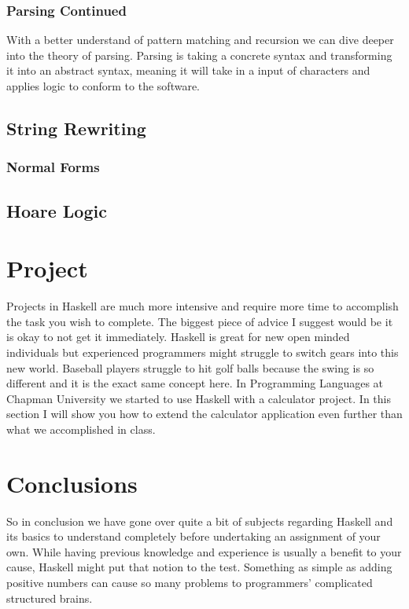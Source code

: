 \documentclass{article}
\begin{document}
        \subsubsection{Parsing Continued}
        With a better understand of pattern matching and recursion we can dive deeper into the theory of parsing. Parsing is taking a concrete syntax and transforming it into an abstract syntax, meaning it will take in a input of characters and applies logic to conform to the software. 
        
\subsection{String Rewriting}

    \subsubsection{Normal Forms}
    
\subsection{Hoare Logic}
    

\section{Project}

Projects in Haskell are much more intensive and require more time to accomplish the task you wish to complete. The biggest piece of advice I suggest would be it is okay to not get it immediately. Haskell is great for new open minded individuals but experienced programmers might struggle to switch gears into this new world. Baseball players struggle to hit golf balls because the swing is so different and it is the exact same concept here. In Programming Languages at Chapman University we started to use Haskell with a calculator project. In this section I will show you how to extend the calculator application even further than what we accomplished in class.

\section{Conclusions}\label{conclusions}

So in conclusion we have gone over quite a bit of subjects regarding Haskell and its basics to understand completely before undertaking an assignment of your own. While having previous knowledge and experience is usually a benefit to your cause, Haskell might put that notion to the test. Something as simple as adding positive numbers can cause so many problems to programmers' complicated structured brains. 
\end{document}

